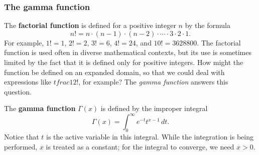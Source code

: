 \subsubsection{The gamma function}
\label{subsubsec:the-gamma-function}

The {\bf factorial function} is defined for
a positive integer $n$ by the formula
	\[
n! = n \cdot (n-1) \cdot (n-2) \cdot \cdots \cdot 
		3 \cdot 2 \cdot 1.
\] 
For example, $1! = 1$, $2! = 2$, $3! = 6$, $4! = 24$, and $10! =
3628800$.  The factorial function is used often in diverse
mathematical contexts, but its use is sometimes limited by the fact
that it is defined only for positive integers.  How might the function
be defined on an expanded domain, so that we could deal with
expressions like $tfrac{1}{2}!$, for example?  The {\em gamma
  function\/} answers this question.


The {\bf gamma function} $\Gamma(x)$ is defined
by the improper integral
\[
\Gamma(x) = \int_0^{\infty} e^{-t} t^{x - 1} \, dt.
\] Notice that $t$ is the active variable in this integral.  While the
integration is being performed, $x$ is treated as a constant; for the
integral to converge, we need $x > 0$.


